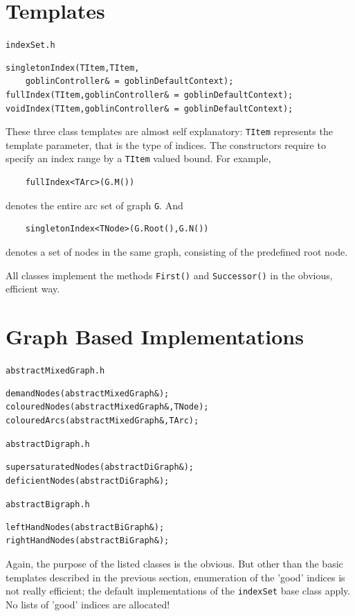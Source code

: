 \documentclass[a4paper,11pt,twoside]{book}
\begin{document}
\begin{multicols}{2}
\section{Templates}
\myinclude\verb/indexSet.h/
\begin{mymethods}
\begin{verbatim}
singletonIndex(TItem,TItem,
    goblinController& = goblinDefaultContext);
fullIndex(TItem,goblinController& = goblinDefaultContext);
voidIndex(TItem,goblinController& = goblinDefaultContext);
\end{verbatim}
\end{mymethods}
These three class templates are almost self explanatory: \verb/TItem/
represents the template parameter, that is the type of indices. The
constructors require to specify an index range by a \verb/TItem/ valued bound.
For example,
\begin{verbatim}
    fullIndex<TArc>(G.M())
\end{verbatim}
denotes the entire arc set of graph \verb/G/. And
\begin{verbatim}
    singletonIndex<TNode>(G.Root(),G.N())
\end{verbatim}
denotes a set of nodes in the same graph, consisting of the predefined root
node.

All classes implement the methods \verb/First()/ and \verb/Successor()/ in the
obvious, efficient way.


\section{Graph Based Implementations}
\myinclude\verb/abstractMixedGraph.h/
\begin{mymethods}
\begin{verbatim}
demandNodes(abstractMixedGraph&);
colouredNodes(abstractMixedGraph&,TNode);
colouredArcs(abstractMixedGraph&,TArc);
\end{verbatim}
\end{mymethods}
\myinclude\verb/abstractDigraph.h/
\begin{mymethods}
\begin{verbatim}
supersaturatedNodes(abstractDiGraph&);
deficientNodes(abstractDiGraph&);
\end{verbatim}
\end{mymethods}
\myinclude\verb/abstractBigraph.h/
\begin{mymethods}
\begin{verbatim}
leftHandNodes(abstractBiGraph&);
rightHandNodes(abstractBiGraph&);
\end{verbatim}
\end{mymethods}
Again, the purpose of the listed classes is the obvious. But other than the
basic templates described in the previous section, enumeration of the 'good'
indices is not really efficient; the default implementations of the \verb/indexSet/
base class apply. No lists of 'good' indices are allocated!


\end{multicols}
\end{document}

